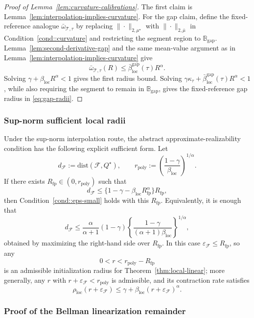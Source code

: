 \documentclass{article}
\newcommand{\loc}{\mathrm{loc}}
\theoremstyle{plain}
\theoremstyle{definition}
\theoremstyle{remark}
\begin{document}
\begin{proof}[Proof of Lemma~\ref{lem:curvature-calibrations}]
The first claim is Lemma~\ref{lem:interpolation-implies-curvature}. For the
gap claim, define the fixed-reference analogue \(\bar\omega_{\mathcal T,\tau}\)
by replacing \(\|\cdot\|_{2,\mu^\star}\) with \(\|\cdot\|_{2,\bar\mu}\) in
Condition~\ref{cond::curvature} and restricting the segment region to
\(\mathbb B_{\mathrm{gap}}\). Lemma~\ref{lem:second-derivative-gap} and the
same mean-value argument as in Lemma~\ref{lem:interpolation-implies-curvature}
give
\[
\bar\omega_{\mathcal T,\tau}(R)
\le
\bar\beta_{\loc}^{\mathrm{gap}}(\tau)R^\alpha .
\]
Solving \(\gamma+\beta_{\loc}R^\alpha<1\) gives the first radius bound.
Solving
\(\gamma\kappa_\tau+\bar\beta_{\loc}^{\mathrm{gap}}(\tau)R^\alpha<1\), while
also requiring the segment to remain in \(\mathbb B_{\mathrm{gap}}\), gives the
fixed-reference gap radius in \eqref{eq:gap-radii}.
\end{proof}

\subsubsection{Sup-norm sufficient local radii}

Under the sup-norm interpolation route, the abstract approximate-realizability
condition has the following explicit sufficient form. Let
\[
d_{\mathcal F}
:=
\mathrm{dist}(\mathcal F,Q^\star),
\qquad
r_{\mathrm{poly}}
:=
\left(\frac{1-\gamma}{\beta_{\loc}}\right)^{1/\alpha}.
\]
If there exists \(R_{\mathrm{fp}}\in(0,r_{\mathrm{poly}})\) such that
\[
d_{\mathcal F}
\le
\{1-\gamma-\beta_{\loc}R_{\mathrm{fp}}^\alpha\}R_{\mathrm{fp}},
\]
then Condition~\ref{cond::eps-small} holds with this \(R_{\mathrm{fp}}\).
Equivalently, it is enough that
\[
d_{\mathcal F}
\le
\frac{\alpha}{\alpha+1}(1-\gamma)
\left\{\frac{1-\gamma}{(\alpha+1)\beta_{\loc}}\right\}^{1/\alpha},
\]
obtained by maximizing the right-hand side over \(R_{\mathrm{fp}}\). In this
case \(\varepsilon_{\mathcal F}\le R_{\mathrm{fp}}\), so any
\[
0<r<r_{\mathrm{poly}}-R_{\mathrm{fp}}
\]
is an admissible initialization radius for Theorem~\ref{thm:local-linear}; more
generally, any \(r\) with \(r+\varepsilon_{\mathcal F}<r_{\mathrm{poly}}\) is
admissible, and its contraction rate satisfies
\[
\rho_{\mathrm{loc}}(r+\varepsilon_{\mathcal F})
\le
\gamma+\beta_{\loc}(r+\varepsilon_{\mathcal F})^\alpha.
\]


\subsubsection{Proof of the Bellman linearization remainder}
\end{document}
